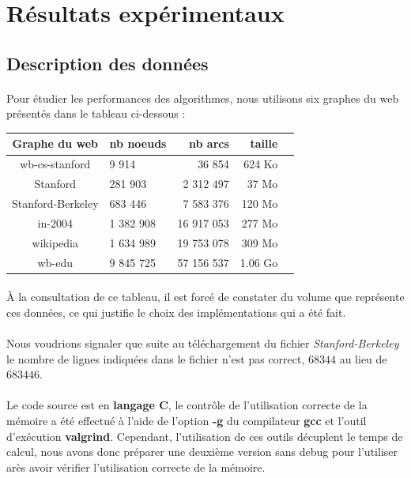 \section{Résultats expérimentaux}
	
	\subsection{Description des données}
		\paragraph{}Pour étudier les performances des algorithmes, nous utilisons six graphes du web présentés dans le tableau ci-dessous :
		
			\begin{center}\begin{tabular}{clrrr}
				\hline
				Graphe du web & nb noeuds & nb arcs & taille \\
				\hline
				wb-cs-stanford & 9 914 & 36 854 & 624 Ko \\
				Stanford & 281 903 & 2 312 497 & 37 Mo \\
				Stanford-Berkeley & 683 446 & 7 583 376 & 120 Mo \\
				in-2004 & 1 382 908 & 16 917 053 & 277 Mo \\
				wikipedia & 1 634 989 & 19 753 078 & 309 Mo \\
				wb-edu & 9 845 725 & 57 156 537 & 1.06 Go \\
				\hline
			\end{tabular}\end{center}
		
		\paragraph{}À la consultation de ce tableau, il est forcé de constater du volume que représente ces données, ce qui justifie le choix des implémentations qui a été fait.
		\paragraph{}Nous voudrions signaler que suite au téléchargement du fichier \textit{Stanford-Berkeley} le nombre de lignes indiquées dans le fichier n'est pas correct, $68344$ au lieu de $683446$.
		\paragraph{}Le code source est en \textbf{langage C}, le contrôle de l'utilisation correcte de la mémoire a été effectué à l'aide de l'option \textbf{-g} du compilateur \textbf{gcc} et l'outil d'exécution \textbf{valgrind}. Cependant, l'utilisation de ces outils décuplent le temps de calcul, nous avons donc préparer une deuxième version sans debug pour l'utiliser arès avoir vérifier l'utilisation correcte de la mémoire.
		
